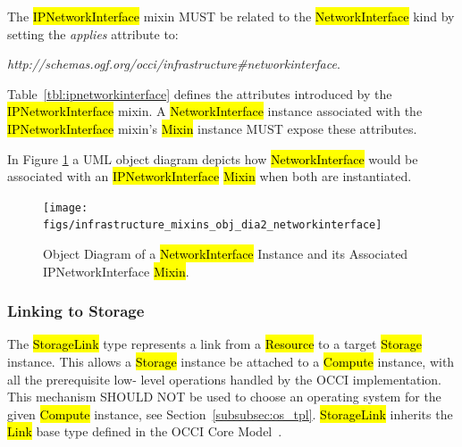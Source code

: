 \documentclass[10pt,a4paper]{article}
\begin{document}
The \hl{IPNetworkInterface} mixin MUST be related to the \hl{NetworkInterface} kind
by setting the \textit{applies} attribute to:

\textit{http://schemas.ogf.org/occi/infrastructure\#networkinterface}.

Table~\ref{tbl:ipnetworkinterface} defines the attributes introduced by
the \hl{IPNetworkInterface} mixin.  A \hl{NetworkInterface} instance
associated with the \hl{IPNetworkInterface} mixin's \hl{Mixin} instance
MUST expose these attributes.


In Figure \ref{fig:networkinterface_mixin} a UML object diagram
depicts how \hl{NetworkInterface} would be associated with an
\hl{IPNetworkInterface} \hl{Mixin} when both are instantiated.

\begin{figure}[!h]
	\centering
	\texttt{[image: figs/infrastructure\_mixins\_obj\_dia2\_networkinterface]}
	\caption{Object Diagram of a \hl{NetworkInterface} Instance and its Associated
	IPNetworkInterface \hl{Mixin}.}
	\label{fig:networkinterface_mixin}
\end{figure}

\subsubsection{Linking to Storage}
\label{subsec:storagelink}
The \hl{StorageLink} type represents a link from a \hl{Resource} to a
target \hl{Storage} instance. This allows a \hl{Storage} instance be
attached to a \hl{Compute} instance, with all the prerequisite low-
level operations handled by the OCCI implementation. This mechanism SHOULD NOT
be used to choose an operating system for the given \hl{Compute} instance, see
Section~\ref{subsubsec:os_tpl}. \hl{StorageLink} inherits the \hl{Link} base
type defined in the OCCI Core Model~\cite{occi:core}.
\end{document}
